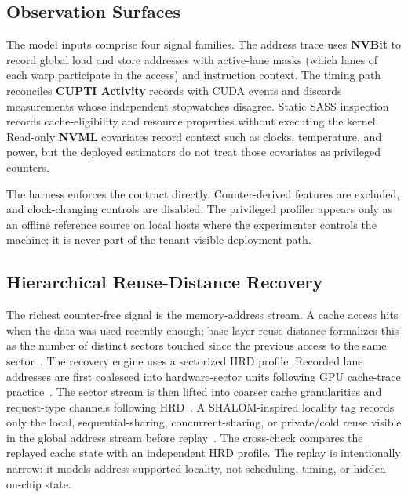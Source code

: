 \documentclass[conference]{IEEEtran}
\begin{document}
\subsection{Observation Surfaces}
\label{sec:signals}

The model inputs comprise four signal families. The address trace uses
\textbf{NVBit} to record global load and store addresses with active-lane
masks (which lanes of each warp participate in the access) and instruction
context. The timing path reconciles \textbf{CUPTI
Activity} records with CUDA events and discards measurements whose independent
stopwatches disagree. Static SASS inspection records cache-eligibility and
resource properties without executing the kernel. Read-only \textbf{NVML}
covariates record context such as clocks, temperature, and power, but the
deployed estimators do not treat those covariates as privileged counters.

The harness enforces the contract directly. Counter-derived features are
excluded, and clock-changing controls are disabled. The privileged profiler
appears only as an offline reference source on local hosts where the
experimenter controls the machine; it is never part of the tenant-visible
deployment path.

\subsection{Hierarchical Reuse-Distance Recovery}
\label{sec:cachemodel}

The richest counter-free signal is the memory-address stream. A cache access
hits when the data was used recently enough; base-layer reuse distance
formalizes this as the number of distinct sectors touched since the previous
access to the same sector~\cite{mattson1970}. The recovery engine uses a
sectorized HRD profile. Recorded lane addresses are first coalesced into
hardware-sector units following GPU cache-trace
practice~\cite{nugteren2014gpucache,kiani2018reuse}. The sector stream is then lifted
into coarser cache granularities and request-type channels following
HRD~\cite{maeda2017hrd}. A SHALOM-inspired locality tag records only the
local, sequential-sharing, concurrent-sharing, or private/cold reuse visible
in the global address stream before replay~\cite{jiang2022shalom}. The
cross-check compares the replayed cache state with an independent HRD profile.
The replay is intentionally narrow: it models
address-supported locality, not scheduling, timing, or hidden on-chip state.
\end{document}
